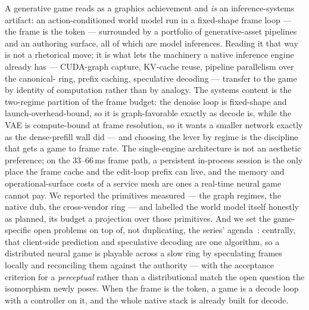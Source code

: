\documentclass[11pt]{article}
\begin{document}
A generative game reads as a graphics achievement and \emph{is} an inference-systems artifact: an
action-conditioned world model run in a fixed-shape frame loop --- the frame is the token --- surrounded by a
portfolio of generative-asset pipelines and an authoring surface, all of which are model inferences. Reading it
that way is not a rhetorical move; it is what lets the machinery a native inference engine already has ---
CUDA-graph capture, KV-cache reuse, pipeline parallelism over the canonical- ring, prefix caching,
speculative decoding --- transfer to the game by identity of computation rather than by analogy. The systems
content is the two-regime partition of the frame budget: the denoise loop is fixed-shape and
launch-overhead-bound, so it is graph-favorable exactly as decode is, while the VAE is compute-bound at frame
resolution, so it wants a smaller network exactly as the dense-prefill wall did --- and choosing the lever by
regime is the discipline that gets a game to frame rate. The single-engine architecture is not an aesthetic
preference; on the $33$--$66$\,ms frame path, a persistent in-process session is the only place the frame cache
and the edit-loop prefix can live, and the memory and operational-surface costs of a service mesh are ones a
real-time neural game cannot pay. We reported the primitives measured --- the graph regimes, the native dub, the
cross-vendor ring --- and labelled the world model itself honestly as planned, its budget a projection over
those primitives. And we set the game-specific open problems on top of, not duplicating, the series'
agenda~\cite{openproblems}: centrally, that client-side prediction and speculative decoding are one algorithm,
so a distributed neural game is playable across a slow ring by speculating frames locally and reconciling them
against the authority --- with the acceptance criterion for a \emph{perceptual} rather than a distributional
match the open question the isomorphism newly poses. When the frame is the token, a game is a decode loop with
a controller on it, and the whole native stack is already built for decode.
\end{document}
